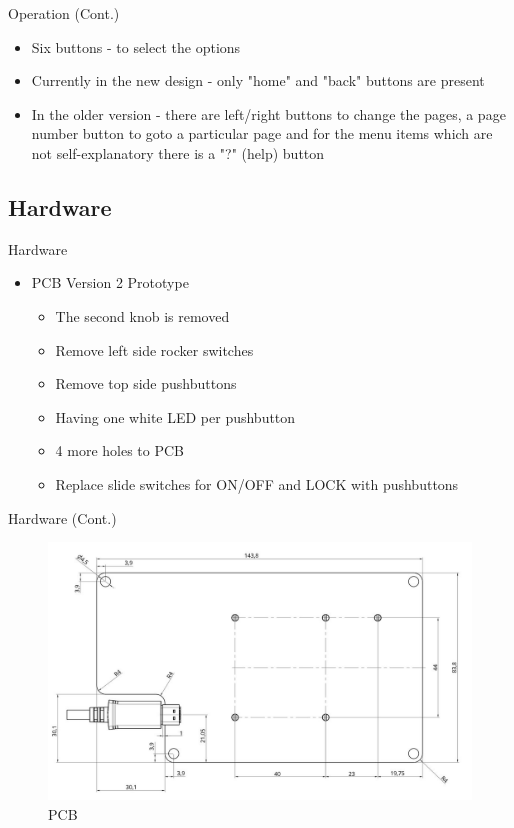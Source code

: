 \documentclass{beamer}
\begin{document}
\begin{frame}{Operation (Cont.)}
	\begin{itemize}
		\item Six buttons - to select the options
		\item Currently in the new design - only "home" and "back" buttons are present
		\item In the older version - there are left/right buttons to change the pages, a page number button to goto a particular page and for the menu items which are not self-explanatory there is a "?" (help) button
	\end{itemize}
\end{frame}

\subsection{Hardware}

\begin{frame}{Hardware}
	\begin{itemize}
		\item PCB Version 2 Prototype
		\begin{itemize}
			\item The second knob is removed
			\item Remove left side rocker switches
			\item Remove top side pushbuttons
			\item Having one white LED per pushbutton
			\item 4 more holes to PCB
			\item Replace slide switches for ON/OFF and LOCK with pushbuttons
		\end{itemize}
	\end{itemize}
\end{frame}

\begin{frame}{Hardware (Cont.)}
	\begin{center}
		\begin{figure}[h]
		    \centering
		    \includegraphics[width=0.8\linewidth]{images/Axiom_Remote_PCB.jpg}
		    \caption{PCB}
		    \label{fig:logo}
		\end{figure}
	\end{center}
\end{frame}
\end{document}
